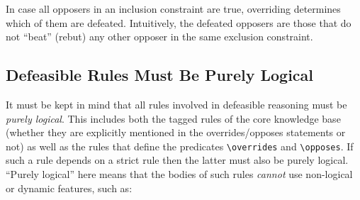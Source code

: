 \documentclass[11pt]{article}
\newcommand{\bs}{\textbackslash}
\begin{document}
In case all opposers in an inclusion constraint are true, overriding
determines which of them are defeated.  Intuitively, the defeated opposers
are those that do not ``beat'' (rebut) any other opposer in the same
exclusion constraint.



\subsection{Defeasible Rules Must Be Purely Logical}
\label{sec-defeasible-logical}

It must be kept in mind that all rules involved in defeasible reasoning
must be \emph{purely logical}.
This includes both the tagged rules of the
core knowledge base (whether they are explicitly mentioned in the
overrides/opposes statements or not) as well as the rules that define the
predicates {\tt \bs{}overrides} and {\tt \bs{}opposes}.
If such a rule depends on a strict
rule then the latter must also be purely logical.
``Purely logical'' here means that the
bodies of such rules \emph{cannot} use non-logical or dynamic features,
such as:
\end{document}
